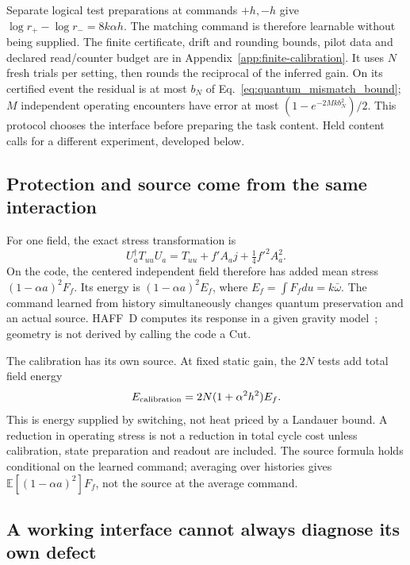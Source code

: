 \documentclass[11pt]{article}
\theoremstyle{definition}
\theoremstyle{remark}
\newcommand{\E}{\mathbb E}
\begin{document}
Separate logical test preparations at commands $+h,-h$ give
$\log r_+-\log r_-=8k\alpha h$. The matching command is therefore
learnable without being supplied. The finite certificate, drift and
rounding bounds, pilot data and declared read/counter budget
are in Appendix~\ref{app:finite-calibration}. It uses $N$ fresh trials
per setting, then rounds the reciprocal of the inferred gain.
On its certified event the residual is at most $b_N$ of
Eq.~\eqref{eq:quantum_mismatch_bound}; $M$ independent operating
encounters have error at most $(1-e^{-2Mkb_N^2})/2$.
This protocol chooses the interface before preparing the task content.
Held content calls for a different experiment, developed below.

\subsection{Protection and source come from the same interaction}

For one field, the exact stress transformation is
\begin{equation}
 U_a^\dagger T_{uu}U_a
 =T_{uu}+f'A_aj+\tfrac14 f'^2 A_a^2.
 \label{eq:learned_stress_identity}
\end{equation}
On the code, the centered independent field therefore has added mean
stress $(1-\alpha a)^2F_f$. Its energy is
$(1-\alpha a)^2E_f$, where
$E_f=\int F_fdu=k\bar\omega$.
The command learned from history simultaneously changes quantum
preservation and an actual source. HAFF~D computes its response in a
given gravity model~\cite{HAFFD}; geometry is not derived by calling
the code a Cut.

The calibration has its own source. At fixed static gain, the $2N$
tests add total field energy
\begin{equation}
 E_{\rm calibration}=2N(1+\alpha^2h^2)E_f.
 \label{eq:calibration_field_energy}
\end{equation}
This is energy supplied by switching, not heat priced by a Landauer
bound. A reduction in operating stress is not a reduction in total
cycle cost unless calibration, state preparation and readout are
included. The source formula holds conditional on the learned
command; averaging over histories gives $\E[(1-\alpha a)^2]F_f$,
not the source at the average command.

\subsection{A working interface cannot always diagnose its own defect}
\end{document}
